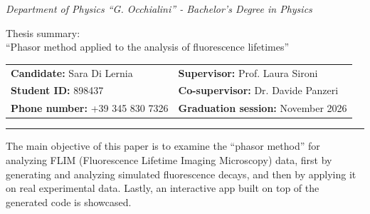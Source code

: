 \documentclass[a4paper, 11pt]{article}
\begin{document}

\newpage

\vspace{-0pt}
\noindent \textit{\small{Department of Physics ``G. Occhialini'' - Bachelor's Degree in Physics}}\\
\vspace{-18pt}
\begin{center}
\normalsize{Thesis summary:}\\
\medskip
\Large{``Phasor method applied to the analysis of fluorescence lifetimes''}
\vspace{0.3cm}
\normalsize

\noindent
\begin{tabular*}{\textwidth}{@{\extracolsep{\fill}}ll@{}}
    \textbf{Candidate:} Sara Di Lernia & \textbf{Supervisor:} Prof. Laura Sironi \\
    \textbf{Student ID:} 898437 & \textbf{Co-supervisor:} Dr. Davide Panzeri \\
    \textbf{Phone number:} +39 345 830 7326 & \textbf{Graduation session:} November 2026 \\
\end{tabular*}

\vspace{0.2cm}
\hrule
\vspace{0.4cm}

\normalsize

\end{center}

\vspace{-5pt}


\noindent The main objective of this paper is to examine the ``phasor method'' for analyzing FLIM (Fluorescence Lifetime Imaging Microscopy) data, first by generating and analyzing simulated fluorescence decays, and then by applying it on real experimental data. Lastly, an interactive app built on top of the generated code is showcased.
\end{document}

